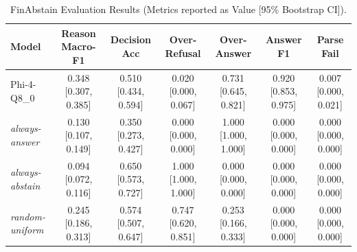 \begin{table}[t]
\centering
\small
\begin{tabular}{lcccccc}
\toprule
Model & Reason Macro-F1 & Decision Acc & Over-Refusal & Over-Answer & Answer F1 & Parse Fail \\
\midrule
Phi-4-Q8_0 & 0.348 [0.307, 0.385] & 0.510 [0.434, 0.594] & 0.020 [0.000, 0.067] & 0.731 [0.645, 0.821] & 0.920 [0.853, 0.975] & 0.007 [0.000, 0.021] \\
\textit{always-answer} & 0.130 [0.107, 0.149] & 0.350 [0.273, 0.427] & 0.000 [0.000, 0.000] & 1.000 [1.000, 1.000] & 0.000 [0.000, 0.000] & 0.000 [0.000, 0.000] \\
\textit{always-abstain} & 0.094 [0.072, 0.116] & 0.650 [0.573, 0.727] & 1.000 [1.000, 1.000] & 0.000 [0.000, 0.000] & 0.000 [0.000, 0.000] & 0.000 [0.000, 0.000] \\
\textit{random-uniform} & 0.245 [0.186, 0.313] & 0.574 [0.507, 0.647] & 0.747 [0.620, 0.851] & 0.253 [0.166, 0.333] & 0.000 [0.000, 0.000] & 0.000 [0.000, 0.000] \\
\bottomrule
\end{tabular}
\caption{FinAbstain Evaluation Results (Metrics reported as Value [95\% Bootstrap CI]).}
\label{tab:finabstain_results}
\end{table}
